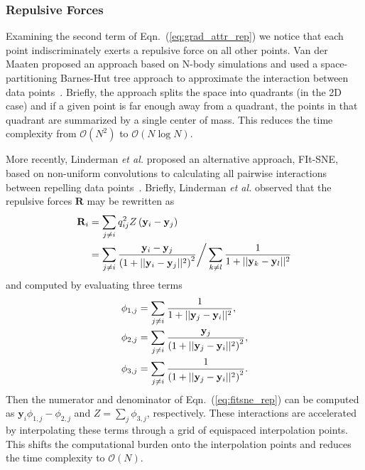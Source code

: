 \documentclass[twocolumn]{bmcart}
\begin{document}
\subsubsection*{Repulsive Forces}

Examining the second term of Eqn.~(\ref{eq:grad_attr_rep}) we notice that each point indiscriminately exerts a repulsive force on all other points. Van der Maaten proposed an approach based on N-body simulations and used a space-partitioning Barnes-Hut tree approach to approximate the interaction between data points~\cite{van2014accelerating}. Briefly, the approach splits the space into quadrants (in the 2D case) and if a given point is far enough away from a quadrant, the points in that quadrant are summarized by a single center of mass. This reduces the time complexity from $\mathcal{O}(N^2)$ to $\mathcal{O}(N \log N)$.

More recently, Linderman \textit{et al.} proposed an alternative approach, FIt-SNE, based on non-uniform convolutions to calculating all pairwise interactions between repelling data points~\cite{linderman2019fast}. Briefly, Linderman \textit{et al.} observed that the repulsive forces $\mathbf{R}$ may be rewritten as
\begin{align}
\mathbf{R}_i &= \sum_{j \neq i} q_{ij}^2 Z \left ( \mathbf{y}_i - \mathbf{y}_j \right ) \notag \\
&= \sum_{j \neq i} \frac{\mathbf{y}_i - \mathbf{y}_j}{\left ( 1 + || \mathbf{y}_i - \mathbf{y}_j ||^2 \right )^{2}}
\bigg/
\sum_{k \neq l} \frac{1}{1 + || \mathbf{y}_k - \mathbf{y}_l || ^2} \label{eq:fitsne_rep}
\end{align} 
and computed by evaluating three terms
\begin{align}
\phi_{1, j} &= \sum_{j \neq i} \frac{1}{1 + || \mathbf{y}_j - \mathbf{y}_i ||^2}, \notag \\
\phi_{2, j} &= \sum_{j \neq i} \frac{\mathbf{y}_j}{\left( 1 + || \mathbf{y}_j - \mathbf{y}_i ||^2 \right)^2}, \notag \\
\phi_{3, j} &= \sum_{j \neq i} \frac{1}{\left( 1 + || \mathbf{y}_j - \mathbf{y}_i ||^2 \right)^2}. \label{eq:fitsne_terms}
\end{align}
Then the numerator and denominator of Eqn.~(\ref{eq:fitsne_rep}) can be computed as $\mathbf{y}_i \phi_{1,j} - \phi_{2,j}$ and $Z = \sum_j \phi_{3,j}$, respectively. These interactions are accelerated by interpolating these terms through a grid of equispaced interpolation points. This shifts the computational burden onto the interpolation points and reduces the time complexity to $\mathcal{O}(N)$.
\end{document}
